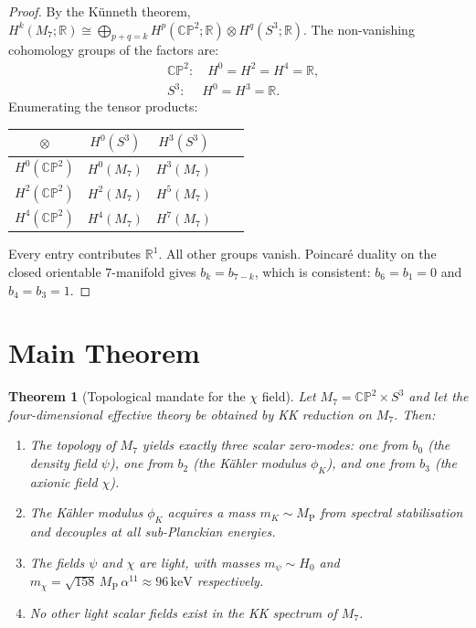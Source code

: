 \documentclass[12pt,a4paper]{article}
\newtheorem{theorem}{Theorem}
\theoremstyle{definition}
\theoremstyle{remark}
\newcommand{\CP}{\mathbb{CP}}
\newcommand{\MP}{M_{\mathrm{P}}}
\newcommand{\keV}{\,\mathrm{keV}}
\begin{document}
\begin{proof}
By the K\"unneth theorem,
$H^k(M_7;\mathbb{R}) \cong \bigoplus_{p+q=k} H^p(\CP^2;\mathbb{R})
\otimes H^q(S^3;\mathbb{R})$.
The non-vanishing cohomology groups of the factors are:
\begin{align*}
  &\CP^2: \quad H^0 = H^2 = H^4 = \mathbb{R}, \\
  &S^3: \quad\; H^0 = H^3 = \mathbb{R}.
\end{align*}
Enumerating the tensor products:
\begin{center}
\renewcommand{\arraystretch}{1.2}
\begin{tabular}{c|cccc}
  $\otimes$ & $H^0(S^3)$ & $H^3(S^3)$ \\
  \hline
  $H^0(\CP^2)$ & $H^0(M_7)$ & $H^3(M_7)$ \\
  $H^2(\CP^2)$ & $H^2(M_7)$ & $H^5(M_7)$ \\
  $H^4(\CP^2)$ & $H^4(M_7)$ & $H^7(M_7)$ \\
\end{tabular}
\end{center}
Every entry contributes $\mathbb{R}^1$.  All other groups vanish.
Poincar\'e duality on the closed orientable $7$-manifold gives
$b_k = b_{7-k}$, which is consistent: $b_6 = b_1 = 0$ and $b_4 = b_3 = 1$.
\end{proof}

\section{Main Theorem}

\begin{theorem}[Topological mandate for the $\chi$ field]\label{thm:main}
Let $M_7 = \CP^2 \times S^3$ and let the four-dimensional effective
theory be obtained by KK reduction on $M_7$.  Then:
\begin{enumerate}
  \item[\textup{(i)}] The topology of $M_7$ yields exactly three
    scalar zero-modes: one from $b_0$ (the density field $\psi$),
    one from $b_2$ (the K\"ahler modulus $\phi_K$), and one from
    $b_3$ (the axionic field $\chi$).
  \item[\textup{(ii)}] The K\"ahler modulus $\phi_K$ acquires a mass
    $m_K \sim \MP$ from spectral stabilisation and decouples at all
    sub-Planckian energies.
  \item[\textup{(iii)}] The fields $\psi$ and $\chi$ are light, with
    masses $m_\psi \sim H_0$ and
    $m_\chi = \sqrt{158}\,\MP\,\alpha^{11} \approx 96\keV$
    respectively.
  \item[\textup{(iv)}] No other light scalar fields exist in the
    KK spectrum of $M_7$.
\end{enumerate}
\end{theorem}
\end{document}
